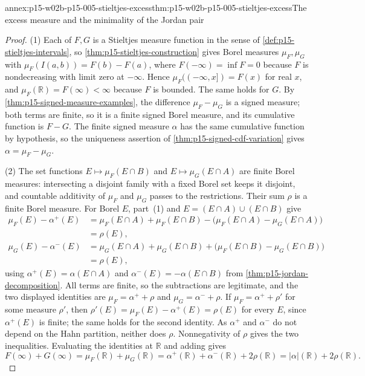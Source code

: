 \begin{annexitem}{annex:p15-w02b-p15-005-stieltjes-excess}{thm:p15-w02b-p15-005-stieltjes-excess}{The excess measure and the minimality of the Jordan pair}
\begin{proof}
(1) Each of \(F,G\) is a Stieltjes measure function in the sense of
\cref{def:p15-stieltjes-intervals}, so
\cref{thm:p15-stieltjes-construction} gives Borel measures
\(\mu_F,\mu_G\) with \(\mu_F(I(a,b))=F(b)-F(a)\), where
\(F(-\infty)=\inf F=0\) because \(F\) is nondecreasing with limit zero
at \(-\infty\). Hence \(\mu_F((-\infty,x])=F(x)\) for real \(x\), and
\(\mu_F(\mathbb R)=F(\infty)<\infty\) because \(F\) is bounded. The
same holds for \(G\). By \cref{thm:p15-signed-measure-examples}, the
difference \(\mu_F-\mu_G\) is a signed measure; both terms are finite,
so it is a finite signed Borel measure, and its cumulative function is
\(F-G\). The finite signed measure \(\alpha\) has the same cumulative
function by hypothesis, so the uniqueness assertion of
\cref{thm:p15-signed-cdf-variation} gives \(\alpha=\mu_F-\mu_G\).

(2) The set functions \(E\mapsto\mu_F(E\cap B)\) and
\(E\mapsto\mu_G(E\cap A)\) are finite Borel measures: intersecting a
disjoint family with a fixed Borel set keeps it disjoint, and countable
additivity of \(\mu_F\) and \(\mu_G\) passes to the restrictions. Their
sum \(\rho\) is a finite Borel measure. For Borel \(E\), part~(1) and
\(E=(E\cap A)\cup(E\cap B)\) give
\[
 \begin{aligned}
 \mu_F(E)-\alpha^+(E)
   &=\mu_F(E\cap A)+\mu_F(E\cap B)
      -\bigl(\mu_F(E\cap A)-\mu_G(E\cap A)\bigr)\\
   &=\rho(E),\\
 \mu_G(E)-\alpha^-(E)
   &=\mu_G(E\cap A)+\mu_G(E\cap B)
      +\bigl(\mu_F(E\cap B)-\mu_G(E\cap B)\bigr)\\
   &=\rho(E),
 \end{aligned}
\]
using \(\alpha^+(E)=\alpha(E\cap A)\) and \(\alpha^-(E)=-\alpha(E\cap B)\)
from \cref{thm:p15-jordan-decomposition}. All terms are finite, so the
subtractions are legitimate, and the two displayed identities are
\(\mu_F=\alpha^++\rho\) and \(\mu_G=\alpha^-+\rho\). If
\(\mu_F=\alpha^++\rho'\) for some measure \(\rho'\), then
\(\rho'(E)=\mu_F(E)-\alpha^+(E)=\rho(E)\) for every \(E\), since
\(\alpha^+(E)\) is finite; the same holds for the second identity. As
\(\alpha^+\) and \(\alpha^-\) do not depend on the Hahn partition, neither
does \(\rho\). Nonnegativity of \(\rho\) gives the two inequalities.
Evaluating the identities at \(\mathbb R\) and adding gives
\[
 F(\infty)+G(\infty)=\mu_F(\mathbb R)+\mu_G(\mathbb R)
  =\alpha^+(\mathbb R)+\alpha^-(\mathbb R)+2\rho(\mathbb R)
  =\lvert\alpha\rvert(\mathbb R)+2\rho(\mathbb R).
\]


\end{proof}
\end{annexitem}
